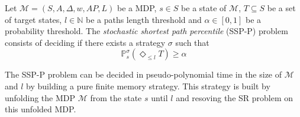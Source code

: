 \begin{definition}
  Let $\mathcal{M} = (S, A, \Delta, w, AP, L)$ be a MDP, $s \in S$ be a state of
  $\mathcal{M}$, $T \subseteq S$ be a set of target states, $l \in \mathbb{N}$
  be a paths length threshold and $\alpha \in [0, 1]$ be a probability
  threshold. The \textit{stochastic shortest path percentile} (SSP-P) problem
  consists of deciding if there exists a strategy $\sigma$ such that
  \[
    \mathbb{P}_s^\sigma (\Diamond_{\leq l} T) \geq \alpha
  \]
\end{definition}

\begin{theorem}
  The SSP-P problem can be decided in pseudo-polynomial time in the size of $\mathcal{M}$ and $l$ by building a pure finite memory strategy. This strategy is built by unfolding the MDP $\mathcal{M}$ from the state $s$ until $l$ and resoving the SR problem on this unfolded MDP.
\end{theorem}

